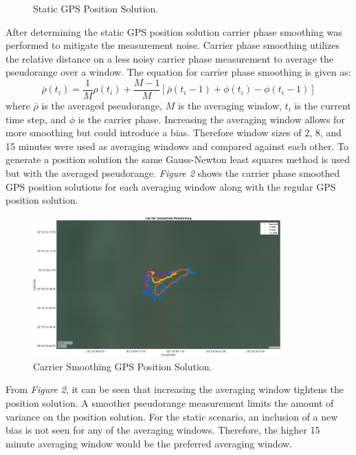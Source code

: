 \documentclass[11pt]{article}
\begin{document}
\begin{enumerate}[label=\textbf{\arabic*.}]
\begin{figure}[H]
        \caption{Static GPS Position Solution.}
    \end{figure}
    After determining the static GPS position solution carrier phase smoothing 
    was performed to mitigate the measurement noise. Carrier phase smoothing 
    utilizes the relative distance on a less noisy carrier phase measurement 
    to average the pseudorange over a window. The equation for carrier phase 
    smoothing is given as:
    \begin{equation}
      \bar{\rho}(t_i ) = \dfrac{1}{M} \rho(t_i)+\dfrac{M-1}{M}
      \left[\bar{\rho}(t_i-1) + \phi(t_i) - \phi(t_i-1)\right]
    \end{equation}
    where $\bar{\rho}$ is the averaged pseudorange, $M$ is the averaging window, 
    $t_i$ is the current time step, and $\phi$ is the carrier phase. Increasing 
    the averaging window allows for more smoothing but could introduce a bias. 
    Therefore window sizes of 2, 8, and 15 minutes were used as averaging windows 
    and compared against each other. To generate a position solution the same 
    Gauss-Newton least squares method is used but with the averaged pseudorange. 
    \emph{Figure 2} shows the carrier phase smoothed GPS position solutions for 
    each averaging window along with the regular GPS position solution. 
    \begin{figure}[H]
      \centering
      \includegraphics[width=0.85\textwidth]{p1_b.png}
      \caption{Carrier Smoothing GPS Position Solution.}
    \end{figure}
    From \emph{Figure 2}, it can be seen that increasing the averaging window 
    tightens the position solution. A smoother pseudorange measurement limits the 
    amount of variance on the position solution. For the static scenario, an 
    inclusion of a new bias is not seen for any of the averaging windows. 
    Therefore, the higher 15 minute averaging window would be the preferred 
    averaging window.

\end{enumerate}
\end{document}
